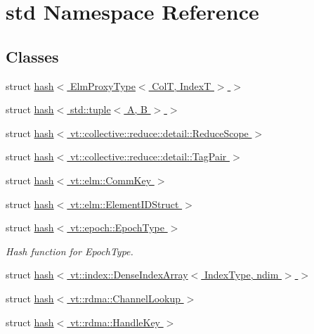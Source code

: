 \hypertarget{namespacestd}{}\section{std Namespace Reference}
\label{namespacestd}
\subsection*{Classes}
\begin{DoxyCompactItemize}
\item 
struct \hyperlink{structstd_1_1hash_3_01_elm_proxy_type_3_01_col_t_00_01_index_t_01_4_01_4}{hash$<$ Elm\+Proxy\+Type$<$ Col\+T, Index\+T $>$ $>$}
\item 
struct \hyperlink{structstd_1_1hash_3_01std_1_1tuple_3_01_a_00_01_b_01_4_01_4}{hash$<$ std\+::tuple$<$ A, B $>$ $>$}
\item 
struct \hyperlink{structstd_1_1hash_3_01vt_1_1collective_1_1reduce_1_1detail_1_1_reduce_scope_01_4}{hash$<$ vt\+::collective\+::reduce\+::detail\+::\+Reduce\+Scope $>$}
\item 
struct \hyperlink{structstd_1_1hash_3_01vt_1_1collective_1_1reduce_1_1detail_1_1_tag_pair_01_4}{hash$<$ vt\+::collective\+::reduce\+::detail\+::\+Tag\+Pair $>$}
\item 
struct \hyperlink{structstd_1_1hash_3_01vt_1_1elm_1_1_comm_key_01_4}{hash$<$ vt\+::elm\+::\+Comm\+Key $>$}
\item 
struct \hyperlink{structstd_1_1hash_3_01vt_1_1elm_1_1_element_i_d_struct_01_4}{hash$<$ vt\+::elm\+::\+Element\+I\+D\+Struct $>$}
\item 
struct \hyperlink{structstd_1_1hash_3_01vt_1_1epoch_1_1_epoch_type_01_4}{hash$<$ vt\+::epoch\+::\+Epoch\+Type $>$}
\begin{DoxyCompactList}\small\item\em Hash function for {\ttfamily Epoch\+Type}. \end{DoxyCompactList}\item 
struct \hyperlink{structstd_1_1hash_3_01vt_1_1index_1_1_dense_index_array_3_01_index_type_00_01ndim_01_4_01_4}{hash$<$ vt\+::index\+::\+Dense\+Index\+Array$<$ Index\+Type, ndim $>$ $>$}
\item 
struct \hyperlink{structstd_1_1hash_3_01vt_1_1rdma_1_1_channel_lookup_01_4}{hash$<$ vt\+::rdma\+::\+Channel\+Lookup $>$}
\item 
struct \hyperlink{structstd_1_1hash_3_01vt_1_1rdma_1_1_handle_key_01_4}{hash$<$ vt\+::rdma\+::\+Handle\+Key $>$}
\item 

\end{DoxyCompactItemize}
